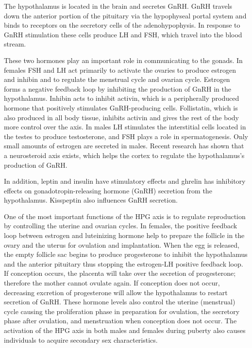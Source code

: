 The hypothalamus is located in the brain and secretes GnRH. GnRH travels down the anterior portion of the pituitary via the hypophyseal portal system and binds to receptors on the secretory cells of the adenohypophysis. In response to GnRH stimulation these cells produce LH and FSH, which travel into the blood stream.

These two hormones play an important role in communicating to the gonads. In females FSH and LH act primarily to activate the ovaries to produce estrogen and inhibin and to regulate the menstrual cycle and ovarian cycle. Estrogen forms a negative feedback loop by inhibiting the production of GnRH in the hypothalamus. Inhibin acts to inhibit activin, which is a peripherally produced hormone that positively stimulates GnRH-producing cells. Follistatin, which is also produced in all body tissue, inhibits activin and gives the rest of the body more control over the axis. In males LH stimulates the interstitial cells located in the testes to produce testosterone, and FSH plays a role in spermatogenesis. Only small amounts of estrogen are secreted in males. Recent research has shown that a neurosteroid axis exists, which helps the cortex to regulate the hypothalamus's production of GnRH.

In addition, leptin and insulin have stimulatory effects and ghrelin has inhibitory effects on gonadotropin-releasing hormone (GnRH) secretion from the hypothalamus. Kisspeptin also influences GnRH secretion.

One of the most important functions of the HPG axis is to regulate reproduction by controlling the uterine and ovarian cycles. In females, the positive feedback loop between estrogen and luteinizing hormone help to prepare the follicle in the ovary and the uterus for ovulation and implantation. When the egg is released, the empty follicle sac begins to produce progesterone to inhibit the hypothalamus and the anterior pituitary thus stopping the estrogen-LH positive feedback loop. If conception occurs, the placenta will take over the secretion of progesterone; therefore the mother cannot ovulate again. If conception does not occur, decreasing excretion of progesterone will allow the hypothalamus to restart secretion of GnRH. These hormone levels also control the uterine (menstrual) cycle causing the proliferation phase in preparation for ovulation, the secretory phase after ovulation, and menstruation when conception does not occur. The activation of the HPG axis in both males and females during puberty also causes individuals to acquire secondary sex characteristics.

